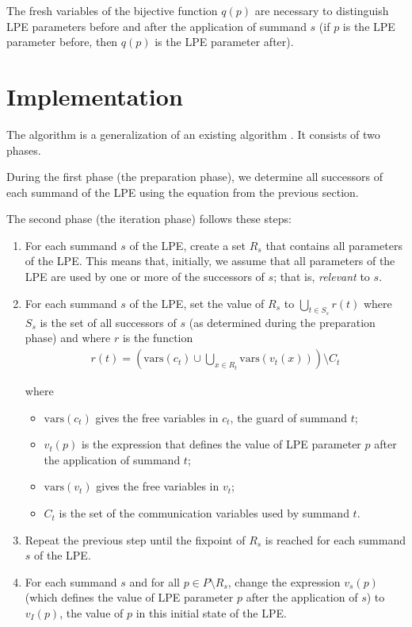 The fresh variables of the bijective function $q(p)$ are necessary to distinguish LPE parameters before and after the application of summand $s$ (if $p$ is the LPE parameter before, then $q(p)$ is the LPE parameter after).

\section{Implementation}

The algorithm is a generalization of an existing algorithm \cite{van2009state}.
It consists of two phases.

During the first phase (the preparation phase), we determine all successors of each summand of the LPE using the equation from the previous section.

The second phase (the iteration phase) follows these steps:

\begin{enumerate}

\item For each summand $s$ of the LPE, create a set $R_s$ that contains all parameters of the LPE.
This means that, initially, we assume that all parameters of the LPE are used by one or more of the successors of $s$; that is, \emph{relevant} to $s$.

\item For each summand $s$ of the LPE, set the value of $R_s$ to $\bigcup\limits_{t \in S_s}^{} r(t)$ where $S_s$ is the set of all successors of $s$ (as determined during the preparation phase) and where $r$ is the function
\begin{align*}
r(t) = \left( \text{vars}(c_t) \cup \bigcup\limits_{x \in R_t}^{} \text{vars}(v_t(x)) \right) \setminus C_t
\end{align*}

where

\begin{itemize}
\item $\text{vars}(c_t)$ gives the free variables in $c_t$, the guard of summand $t$;
\item $v_t(p)$ is the expression that defines the value of LPE parameter $p$ after the application of summand $t$;
\item $\text{vars}(v_t)$ gives the free variables in $v_t$;
\item $C_t$ is the set of the communication variables used by summand $t$.
\end{itemize}

\item Repeat the previous step until the fixpoint of $R_s$ is reached for each summand $s$ of the LPE.

\item For each summand $s$ and for all $p \in P \setminus R_s$, change the expression $v_s(p)$ (which defines the value of LPE parameter $p$ after the application of $s$) to $v_I(p)$, the value of $p$ in this initial state of the LPE.

\end{enumerate}

